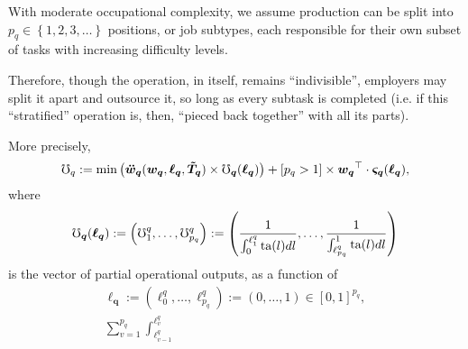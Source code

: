 \documentclass[hidelinks, nonatbib]{elsarticle}
\begin{document}
\begin{axiom}
    \begin{subaxiom} With moderate occupational complexity, we assume production can be split into $p_q \in \left\{1, 2, 3, \dots\right\}$ positions, or job subtypes, each responsible for their own subset of tasks with increasing difficulty levels.
    
    Therefore, though the operation, in itself, remains ``indivisible'', employers may split it apart and outsource it, so long as every subtask is completed (i.e. if this ``stratified'' operation is, then, ``pieced back together'' with all its parts).

    More precisely,
    \begin{gather}
        \mho_q
        :=
        \min\left(
            \boldsymbol{\ddot{w}_{q}}(
                \boldsymbol{w_{q}},
                \boldsymbol{\ell_{q}},
                \boldsymbol{\tilde{T}_{q}}
            )
            \times
            \boldsymbol{\mho_{q}}(
                \boldsymbol{\ell_{q}}
            )
        \right)
        +
        [p_q > 1]
        \times
        \boldsymbol{w_{q}} ^ {\top}
        \cdot 
        \boldsymbol{\varsigma_{q}}(
            \boldsymbol{\ell_{q}}
        )
        ,
    \end{gather}
    where
    \begin{gather}
        \boldsymbol{\mho_{q}}(
            \boldsymbol{\ell_{q}}
        )
        :=
        \left(
            \mho_{1}^{q}
            ,
            \dots
            ,
            \mho_{p_q}^{q}
        \right)
        :=
        \left(
            \frac{1}{
                \int_{0}^{\ell_{1}^{q}}
                \text{ta}(l)dl
            }
            ,
            \dots
            ,
            \frac{1}{
                \int_{\ell_{p_q}^{q}}^{1}
                \text{ta}(l)dl
            }
        \right)
    \end{gather}
    is the vector of partial operational outputs, as a function of
    \begin{gather}
        \boldsymbol{\ell_q}
        :=
        \left(
            \ell_{0}^{q}
            ,
            \dots
            ,
            \ell_{p_q}^{q}
        \right)
        :=
        \left(
            0
            ,
            \dots
            ,
            1
        \right)
        \in
        [0,1] ^ {p_q}
        ,
        \\
        \sum_{v=1}^{p_q}{
            \int_{
                \ell_{v-1}^{q}
            }^{
                \ell_{v}^{q}
            }
}
\end{gather}
\end{subaxiom}
\end{axiom}
\end{document}
